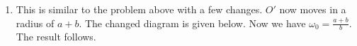 \documentclass[oneside]{book}\twocolumn
\begin{document}
\begin{enumerate}
\begin{center}
\begin{tikzpicture}[x=0.75pt,y=0.75pt,yscale=-1,xscale=1]
\end{tikzpicture}

    \end{center}
    \item This is similar to the problem above with a few changes. $O'$ now moves in a radius of $a+b$. The changed diagram is given below. Now we have $\omega_0=\frac{a+b}{b}$. The result follows.
    \begin{center}
        


\begin{tikzpicture}[x=0.75pt,y=0.75pt,yscale=-1,xscale=1]


\end{tikzpicture}
\end{center}
\end{enumerate}
\end{document}

